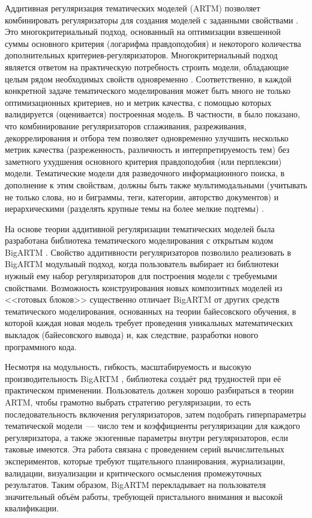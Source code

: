 Аддитивная регуляризация тематических моделей (ARTM) позволяет комбинировать регуляризаторы для создания моделей с заданными свойствами \cite{voron14dan-eng,voron15mlj}. Это многокритериальный подход, основанный на оптимизации взвешенной суммы основного критерия (логарифма правдоподобия) и некоторого количества дополнительных критериев-регуляризаторов. Многокритериальный подход является ответом на практическую потребность строить модели, обладающие целым рядом необходимых свойств одновременно \cite{kochedykov2017fast}. 
Соответственно, в каждой конкретной задаче тематического моделирования может быть много не только оптимизационных критериев, но и метрик качества, с помощью которых валидируется (оценивается) построенная модель. В частности, в \cite{voron15mlj,voron15mlj} было показано, что комбинирование регуляризаторов сглаживания, разреживания, декоррелирования и отбора тем позволяет одновременно улучшить несколько метрик качества (разреженность, различность и интерпретируемость тем) без заметного ухудшения основного критерия правдоподобия (или перплексии) модели. Тематические модели для разведочного информационного поиска, в дополнение к этим свойствам, должны быть также мультимодальными (учитывать не только слова, но и биграммы, теги, категории, авторство документов) и иерархическими (разделять крупные темы на более мелкие подтемы) \cite{ianina2019regularized}. 

На основе теории аддитивной регуляризации тематических моделей
была разработана библиотека тематического моделирования с открытым кодом BigARTM \cite{vorontsov2015bigartm,frei2016parallel}. 
Свойство аддитивности регуляризаторов позволило реализовать в BigARTM модульный подход, когда пользователь выбирает из библиотеки нужный ему набор регуляризаторов для построения модели с требуемыми свойствами. 
Возможность конструирования новых композитных моделей из <<готовых блоков>> существенно отличает BigARTM от других средств тематического моделирования, основанных на теории байесовского обучения, в которой каждая новая модель требует проведения уникальных математических выкладок (байесовского вывода) и, как следствие, разработки нового программного кода. 

Несмотря на модульность, гибкость, масштабируемость и высокую производительность BigARTM \cite{kochedykov2017fast}, библиотека создаёт ряд трудностей при её практическом применении. Пользователь должен хорошо разбираться в теории ARTM, чтобы грамотно выбрать стратегию регуляризации, то есть последовательность включения регуляризаторов, затем подобрать гиперпараметры тематической модели~--- число тем и коэффициенты регуляризации для каждого регуляризатора, а также экзогенные параметры внутри регуляризаторов, если таковые имеются. Эта работа связана с проведением серий вычислительных экспериментов, которые требуют тщательного планирования, журнализации, валидации, визуализации и критического осмысления промежуточных результатов. Таким образом, BigARTM перекладывает на пользователя значительный объём работы, требующей пристального внимания и высокой квалификации. 

